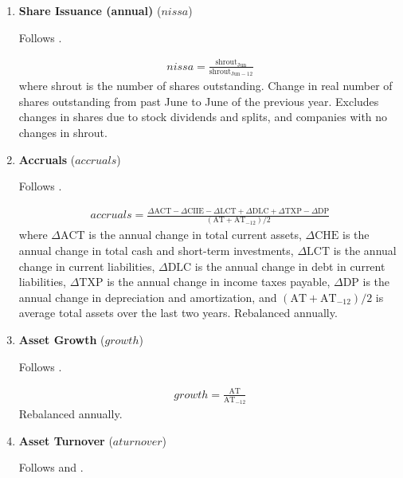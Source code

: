 \begin{enumerate}
	
	
	\item \textbf{Share Issuance (annual)} ($nissa$)
	
	Follows . 
	
	\begin{align*}
		nissa = \frac{ \mathrm{shrout}_{\mathrm{Jun}} }{ \mathrm{shrout}_{\mathrm{Jun-12}} }
	\end{align*}	
	where shrout is the number of shares outstanding. Change in real number of shares outstanding from past June to June of the previous year. Excludes changes in shares due to stock dividends and splits, and companies with no changes in shrout.
	
	
	
	\item \textbf{Accruals} ($accruals$) 
	
	Follows . 
	
	\begin{align*}
		accruals =\frac{\Delta \mathrm{ACT}-\Delta \mathrm{CIIE}-\Delta \mathrm{LCT}+\Delta \mathrm{DLC}+\Delta \mathrm{TXP}-\Delta \mathrm{DP}}{(\mathrm{AT}+\mathrm{AT}_{-12}) / 2}
	\end{align*}
	where $\Delta \mathrm{ACT}$ is the annual change in total current assets, $\Delta \mathrm{CHE}$ is the annual change in total cash and short-term investments, $\Delta \mathrm{LCT}$ is the annual change in current liabilities, $\Delta \mathrm{DLC}$ is the annual change in debt in current liabilities, $\Delta \mathrm{TXP}$ is the annual change in income taxes payable, $\Delta \mathrm{DP}$ is the annual change in depreciation and amortization, and $\left(\mathrm{AT}+\mathrm{AT}_{-12}\right) / 2$ is average total assets over the last two years. Rebalanced annually.
	
	
	
	\item \textbf{Asset Growth} ($growth$) 
	
	Follows . 
	
	\begin{align*}
		growth = \frac{ \mathrm{AT} }{ \mathrm{AT}_{-12} }
	\end{align*}	
	Rebalanced annually.
	
	\item \textbf{Asset Turnover} ($aturnover$) 
	
	Follows  and .
	

\end{enumerate}
